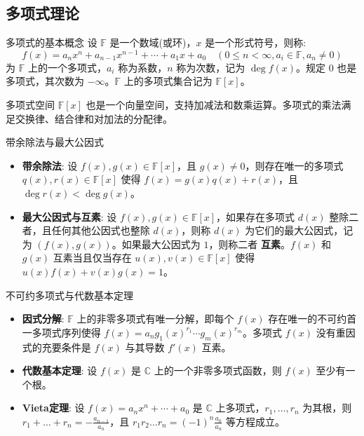 \documentclass[a4paper,12pt]{ctexart}
\begin{document}
\subsection{多项式理论}

\begin{mydef}{多项式的基本概念}{}
设 $\mathbb{F}$ 是一个数域(或环)，$x$ 是一个形式符号，则称:
\[
f(x) = a_n x^n + a_{n-1} x^{n-1} + \cdots + a_1 x + a_0 \quad (0 \leq n < \infty, a_i \in \mathbb{F}, a_n \neq 0)
\]
为 $\mathbb{F}$ 上的一个多项式，$a_i$ 称为系数，$n$ 称为次数，记为 $\deg f(x)$。规定 $0$ 也是多项式，其次数为 $-\infty$。$\mathbb{F}$ 上的多项式集合记为 $\mathbb{F}[x]$。

多项式空间 $\mathbb{F}[x]$ 也是一个向量空间，支持加减法和数乘运算。多项式的乘法满足交换律、结合律和对加法的分配律。
\end{mydef}

\begin{mythm}{带余除法与最大公因式}{}
\begin{itemize}
    \item \textbf{带余除法}: 设 $f(x), g(x) \in \mathbb{F}[x]$，且 $g(x) \neq 0$，则存在唯一的多项式 $q(x), r(x) \in \mathbb{F}[x]$ 使得 $f(x) = g(x)q(x) + r(x)$，且 $\deg r(x) < \deg g(x)$。
    \item \textbf{最大公因式与互素}: 设 $f(x), g(x) \in \mathbb{F}[x]$，如果存在多项式 $d(x)$ 整除二者，且任何其他公因式也整除 $d(x)$，则称 $d(x)$ 为它们的最大公因式，记为 $(f(x), g(x))$。如果最大公因式为 $1$，则称二者 \textbf{互素}。$f(x)$ 和 $g(x)$ 互素当且仅当存在 $u(x), v(x) \in \mathbb{F}[x]$ 使得 $u(x)f(x) + v(x)g(x) = 1$。
\end{itemize}
\end{mythm}

\begin{mythm}{不可约多项式与代数基本定理}{}
\begin{itemize}
    \item \textbf{因式分解}: $\mathbb{F}$ 上的非零多项式有唯一分解，即每个 $f(x)$ 存在唯一的不可约首一多项式序列使得 $f(x) = a_n g_1(x)^{r_1} \cdots g_m(x)^{r_m}$。多项式 $f(x)$ 没有重因式的充要条件是 $f(x)$ 与其导数 $f'(x)$ 互素。
    \item \textbf{代数基本定理}: 设 $f(x)$ 是 $\mathbb{C}$ 上的一个非零多项式函数，则 $f(x)$ 至少有一个根。
    \item \textbf{Vieta定理}: 设 $f(x) = a_n x^n + \cdots + a_0$ 是 $\mathbb{C}$ 上多项式，$r_1, \dots, r_n$ 为其根，则 $r_1 + \dots + r_n = -\frac{a_{n-1}}{a_n}$，且 $r_1 r_2 \dots r_n = (-1)^n \frac{a_0}{a_n}$ 等方程成立。
\end{itemize}
\end{mythm}
\end{document}
